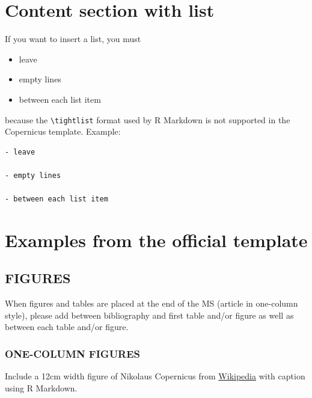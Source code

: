 \documentclass[, manuscript]{copernicus}
\begin{document}
\section{Content section with list}

If you want to insert a list, you must

\begin{itemize}
\item
  leave
\item
  empty lines
\item
  between each list item
\end{itemize}

because the \texttt{\textbackslash{}tightlist} format used by R Markdown
is not supported in the Copernicus template. Example:

\begin{verbatim}
- leave

- empty lines

- between each list item
\end{verbatim}

\section{Examples from the official template}

\subsection{FIGURES}

When figures and tables are placed at the end of the MS (article in
one-column style), please add \clearpage between bibliography and first
table and/or figure as well as between each table and/or figure.

\subsubsection{ONE-COLUMN FIGURES}

Include a 12cm width figure of Nikolaus Copernicus from
\href{https://en.wikipedia.org/wiki/File:Nikolaus_Kopernikus.jpg}{Wikipedia}
with caption using R Markdown.
\end{document}

